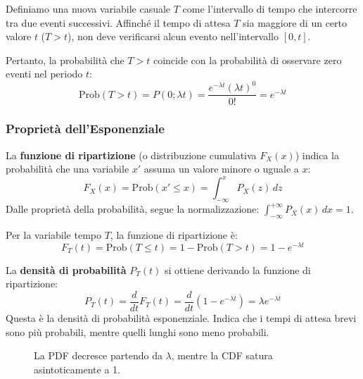 \documentclass[openany,a4paper,12pt]{book}
\theoremstyle{remark}
\begin{document}
Definiamo una nuova variabile casuale $T$ come l'intervallo di tempo che intercorre tra due eventi successivi.
Affinché il tempo di attesa $T$ sia maggiore di un certo valore $t$ ($T > t$), non deve verificarsi alcun evento nell'intervallo $[0, t]$.

Pertanto, la probabilità che $T > t$ coincide con la probabilità di osservare zero eventi nel periodo $t$:
\begin{equation}
    \text{Prob}(T > t) = P(0; \lambda t) = \frac{e^{-\lambda t} (\lambda t)^0}{0!} = e^{-\lambda t}
\end{equation}


\subsubsection*{Proprietà dell'Esponenziale}
La \textbf{funzione di ripartizione} (o distribuzione cumulativa $F_X(x)$) indica la probabilità che una variabile $x'$ assuma un valore minore o uguale a $x$:
\begin{equation}
    F_X(x) = \text{Prob}(x' \le x) = \int_{-\infty}^{x} P_X(z) \, dz
\end{equation}
Dalle proprietà della probabilità, segue la normalizzazione: $\int_{-\infty}^{+\infty} P_X(x) \, dx = 1$.

Per la variabile tempo $T$, la funzione di ripartizione è:
\begin{equation}
    F_T(t) = \text{Prob}(T \le t) = 1 - \text{Prob}(T > t) = 1 - e^{-\lambda t}
\end{equation}

La \textbf{densità di probabilità} $P_T(t)$ si ottiene derivando la funzione di ripartizione:
\begin{equation}
    P_T(t) = \frac{d}{dt} F_T(t) = \frac{d}{dt} (1 - e^{-\lambda t}) = \lambda e^{-\lambda t}
\end{equation}
Questa è la densità di probabilità esponenziale. Indica che i tempi di attesa brevi sono più probabili, mentre quelli lunghi sono meno probabili.


\begin{figure}[ht!]
    \centering
    \caption{La PDF decresce partendo da $\lambda$, mentre la CDF satura asintoticamente a 1.}
\end{figure}
\end{document}
